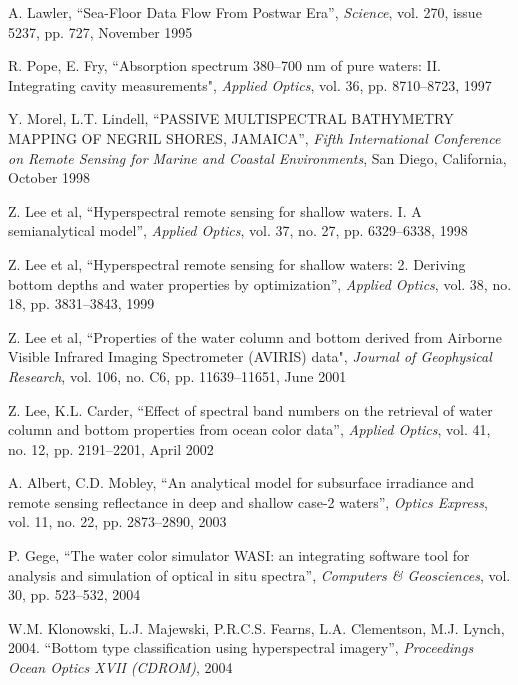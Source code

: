 \begin{thebibliography}{99}
 A. Lawler, ``Sea-Floor Data Flow From Postwar Era'', \textit{Science}, vol. 270, issue 5237, pp. 727, November 1995

 R. Pope, E. Fry, ``Absorption spectrum  380--700 nm  of pure waters: II. Integrating cavity measurements", \textit{Applied Optics}, vol. 36, pp. 8710--8723, 1997

 Y. Morel, L.T. Lindell, ``PASSIVE MULTISPECTRAL BATHYMETRY MAPPING OF NEGRIL SHORES, JAMAICA'', 
\textit{Fifth International Conference on Remote Sensing for Marine and Coastal Environments}, San Diego, California, October 1998

 Z. Lee et al, ``Hyperspectral remote sensing
for shallow waters. I. A semianalytical model'', \textit{Applied Optics}, vol. 37, no. 27, pp. 6329--6338, 1998

 Z. Lee et al, ``Hyperspectral remote sensing for shallow waters: 2. Deriving bottom depths and water properties
by optimization'', \textit{Applied Optics}, vol. 38, no. 18, pp. 3831--3843, 1999

 Z. Lee et al, ``Properties of the water column and bottom derived from Airborne Visible Infrared Imaging Spectrometer (AVIRIS) data", \textit{Journal of Geophysical Research}, vol. 106, no. C6, pp. 11639--11651, June 2001

 Z. Lee, K.L. Carder, ``Effect of spectral band numbers on the retrieval of water column and bottom properties
from ocean color data'', \textit{Applied Optics}, vol. 41, no. 12, pp. 2191--2201, April 2002


 A. Albert, C.D. Mobley, ``An analytical model for subsurface irradiance and remote sensing reflectance in deep and shallow case-2 waters'', \textit{Optics Express}, vol. 11, no. 22, pp. 2873--2890, 2003

 P. Gege, ``The water color simulator WASI: an integrating software tool for analysis and simulation of optical in situ spectra'', \textit{Computers \& Geosciences}, vol. 30, pp. 523--532, 2004

 W.M. Klonowski, L.J. Majewski, P.R.C.S. Fearns, L.A. Clementson, M.J. Lynch, 2004. ``Bottom type classification using hyperspectral imagery'', \textit{Proceedings Ocean Optics XVII (CDROM)}, 2004


\end{thebibliography}
